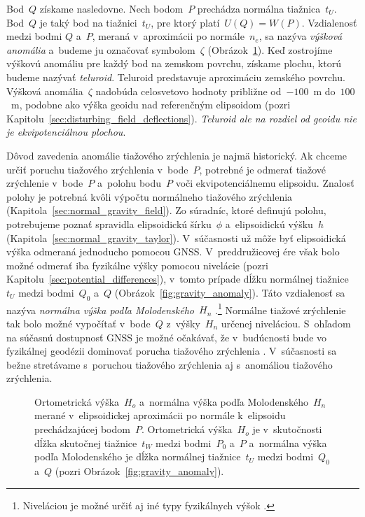 \documentclass[a4paper, 12pt]{book}
\begin{document}
Bod~$Q$ získame nasledovne.  Nech bodom~$P$ prechádza normálna tiažnica~$t_U$.  
Bod~$Q$ je taký bod na tiažnici~$t_U$, pre ktorý platí~$U(Q) = W(P)$.  
Vzdialenosť medzi bodmi $Q$ a~$P$, meraná v~aproximácii po normále~$n_e$, sa 
nazýva \emph{výšková anomália} a~budeme ju označovať symbolom~$\zeta$ 
(Obrázok~\ref{fig:heights}).  Keď zostrojíme výškovú anomáliu pre každý bod na 
zemskom povrchu, získame plochu, ktorú budeme nazývať \emph{teluroid}.  
Teluroid predstavuje aproximáciu zemského povrchu.  Výšková anomália~$\zeta$ 
nadobúda celosvetovo hodnoty približne od~$-100$~m do~$100$~m, podobne ako 
výška geoidu nad referenčným elipsoidom (pozri 
Kapitolu~\ref{sec:disturbing_field_deflections}).  \emph{Teluroid ale na 
rozdiel od geoidu nie je ekvipotenciálnou plochou}.

Dôvod zavedenia anomálie tiažového zrýchlenia je najmä historický.  Ak chceme 
určiť poruchu tiažového zrýchlenia v~bode~$P$, potrebné je odmerať tiažové 
zrýchlenie v~bode~$P$ a~polohu bodu~$P$ voči ekvipotenciálnemu elipsoidu.  
Znalosť polohy je potrebná kvôli výpočtu normálneho tiažového zrýchlenia 
(Kapitola~\ref{sec:normal_gravity_field}).  Zo súradníc, ktoré definujú polohu, 
potrebujeme poznať spravidla elipsoidickú šírku~$\phi$ a~elipsoidickú výšku~$h$ 
(Kapitola~\ref{sec:normal_gravity_taylor}).  V~súčasnosti už môže byť 
elipsoidická výška odmeraná jednoducho pomocou GNSS.  V~preddružicovej ére však 
bolo možné odmerať iba fyzikálne výšky pomocou nivelácie (pozri 
Kapitolu~\ref{sec:potential_differences}), v~tomto prípade dĺžku normálnej 
tiažnice~$t_U$ medzi bodmi~$Q_0$ a~$Q$ (Obrázok~\ref{fig:gravity_anomaly}).  
Táto vzdialenosť sa nazýva \emph{normálna výška podľa Molodenského}~$H_n$ 
\parencite{MoritzPhysicalGeodesy}.\footnote{Niveláciou je možné určiť aj iné 
typy fyzikálnych výšok \parencite[pozri napríklad][]{MoritzPhysicalGeodesy}.}  
Normálne tiažové zrýchlenie tak bolo možné vypočítať v~bode~$Q$ z~výšky~$H_n$ 
určenej niveláciou.  S~ohľadom na súčasnú dostupnosť GNSS je možné očakávať, že 
v~budúcnosti bude vo fyzikálnej geodézii dominovať porucha tiažového zrýchlenia 
\parencite{MoritzPhysicalGeodesy}.  V~súčasnosti sa bežne stretávame s~poruchou 
tiažového zrýchlenia aj s~anomáliou tiažového zrýchlenia.

\begin{figure}[bt]
\centering

\caption{Ortometrická výška~$H_o$ a~normálna výška podľa Molodenského~$H_n$ 
merané v~elipsoidickej aproximácii po normále k~elipsoidu prechádzajúcej 
bodom~$P$.  Ortometrická výška~$H_o$ je v~skutočnosti dĺžka skutočnej 
tiažnice~$t_W$ medzi bodmi~$P_0$ a~$P$ a~normálna výška podľa Molodenského je 
dĺžka normálnej tiažnice~$t_U$ medzi bodmi~$Q_0$ a~$Q$ (pozri 
Obrázok~\ref{fig:gravity_anomaly}).}
\label{fig:heights}
\end{figure}
\end{document}
